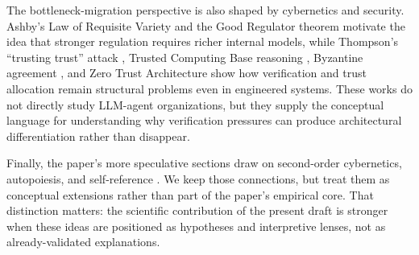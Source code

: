 The bottleneck-migration perspective is also shaped by cybernetics and security. Ashby's Law of Requisite Variety \cite{ashby1956} and the Good Regulator theorem \cite{conant1970} motivate the idea that stronger regulation requires richer internal models, while Thompson's ``trusting trust'' attack \cite{thompson1984}, Trusted Computing Base reasoning \cite{rushby1981}, Byzantine agreement \cite{lamport1982}, and Zero Trust Architecture \cite{rose2020} show how verification and trust allocation remain structural problems even in engineered systems. These works do not directly study LLM-agent organizations, but they supply the conceptual language for understanding why verification pressures can produce architectural differentiation rather than disappear.

Finally, the paper's more speculative sections draw on second-order cybernetics, autopoiesis, and self-reference \cite{maturana1980,vonfoerster2003,lawvere1969,godel1931}. We keep those connections, but treat them as conceptual extensions rather than part of the paper's empirical core. That distinction matters: the scientific contribution of the present draft is stronger when these ideas are positioned as hypotheses and interpretive lenses, not as already-validated explanations.
